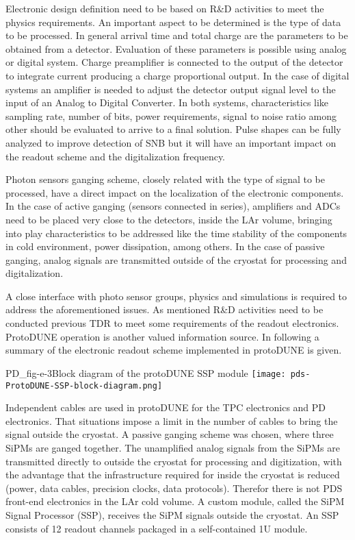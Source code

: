 Electronic design definition need to be based on R\&D activities to meet the physics requirements. An important aspect to be determined is the type of data to be processed.
In general arrival time and total charge are the parameters to be obtained from a detector. Evaluation of these parameters is possible using analog or digital system. 
Charge preamplifier is connected to the output of the detector to integrate current producing a charge proportional output. In the case of digital systems an amplifier is needed to adjust the detector output signal level to the input of an Analog to Digital Converter.  In both systems, characteristics like sampling rate, number of bits, power requirements, signal to noise ratio among other should be evaluated to arrive to a final solution.  Pulse shapes can be fully analyzed to improve detection of  SNB but it will have an important impact on the readout scheme and the digitalization frequency.

Photon sensors ganging scheme, closely related with the type of signal to be processed, have a direct impact on the localization of the electronic components. In the case of active ganging (sensors connected in series), amplifiers and ADCs need to be placed very close to the detectors, inside the LAr volume, bringing into play characteristics to be addressed like the time stability of the components in cold environment, power dissipation, among others. In the case of passive ganging, analog signals are transmitted outside of the cryostat for processing and digitalization. 

A close interface with photo sensor groups, physics and simulations is required to address the aforementioned issues. As mentioned R\&D activities need to be conducted  previous TDR to meet some requirements of the readout electronics. ProtoDUNE operation is another valued information source. In following a summary of the electronic readout scheme implemented in protoDUNE is given.

\begin{dunefigure}{PD_fig-e-3}{Block diagram of the protoDUNE SSP module} 
\texttt{[image: pds-ProtoDUNE-SSP-block-diagram.png]}
\end{dunefigure}

Independent cables are used in protoDUNE for the TPC electronics and PD electronics. That situations impose a limit in the number of cables to bring the signal outside the cryostat.  A passive ganging scheme was chosen, where three SiPMs are ganged together.  
The unamplified analog signals from the SiPMs are transmitted directly to outside the cryostat
for processing and digitization, with the advantage that the infrastructure required for inside the cryostat is  
reduced (power, data cables, precision clocks, data protocols). Therefor there is not PDS front-end electronics in the LAr cold volume. 
A custom module, called the SiPM Signal Processor (SSP), receives the SiPM signals outside the cryostat. An SSP consists of 12 readout channels packaged in a self-contained 1U module.  


